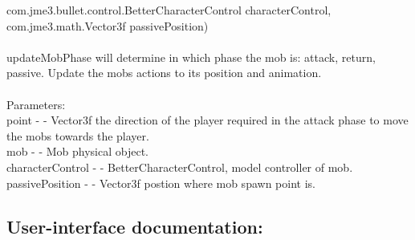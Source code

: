 \documentclass[letterpaper]{article}
\begin{document}
\begin{itemize}
\begin{itemize}
		                  com.jme3.bullet.control.BetterCharacterControl characterControl, \\
		                  com.jme3.math.Vector3f passivePosition) \\ \\
											updateMobPhase will determine in which phase the mob is: attack, return, passive. Update the mobs actions to its position and animation. \\ \\
											Parameters: \\
											point - - Vector3f the direction of the player required in the attack phase to move the mobs towards the player. \\
											mob - - Mob physical object. \\
											characterControl - - BetterCharacterControl, model controller of mob. \\
											passivePosition - - Vector3f postion where mob spawn point is.
								\end{itemize}
					\end{itemize}
			
			\vspace{0.2in}
			\subsection*{User-interface documentation:}
			\vspace{0.1in}
			
\end{document}
